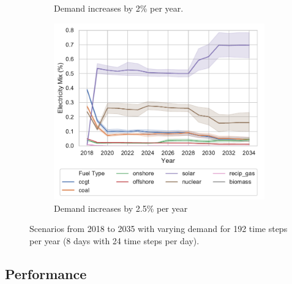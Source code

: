 \begin{figure}
\begin{subfigure}{0.6\textwidth}
		\caption{\small Demand increases by 2\% per year.}
		\label{fig:demand102}
	\end{subfigure}
	\begin{subfigure}{0.6\textwidth}
		\centering
		\includegraphics[width=\textwidth]{Chapter4/figures/scenarios/representative-day-scenarios/1025_demand_mix.pdf}
		\caption{\small Demand increases by 2.5\% per year}
		\label{fig:demand1025}
	\end{subfigure}
	\caption{Scenarios from 2018 to 2035 with varying demand for 192 time steps per year (8 days with 24 time steps per day).}
	\label{elecsim:fig:decreasing_demand}
\end{figure}























\subsection{Performance}


